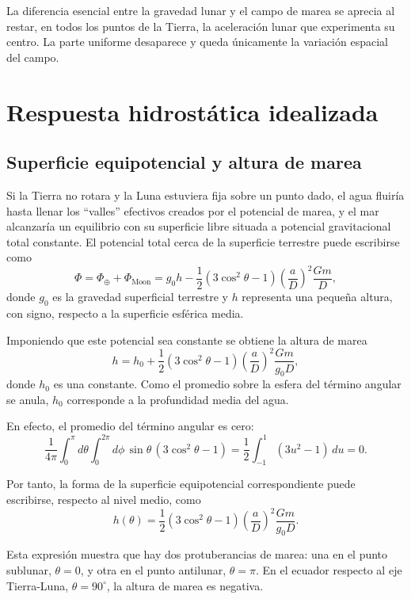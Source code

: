 La diferencia esencial entre la gravedad lunar y el campo de marea se aprecia al restar, en todos los puntos de la Tierra, la aceleración lunar que experimenta su centro. La parte uniforme desaparece y queda únicamente la variación espacial del campo.

\figuraCampoMarea

\section{Respuesta hidrostática idealizada}

\subsection{Superficie equipotencial y altura de marea}

Si la Tierra no rotara y la Luna estuviera fija sobre un punto dado, el agua fluiría hasta llenar los “valles” efectivos creados por el potencial de marea, y el mar alcanzaría un equilibrio con su superficie libre situada a potencial gravitacional total constante. El potencial total cerca de la superficie terrestre puede escribirse como
$$ \Phi = \Phi_{\oplus} + \Phi_{\mathrm{Moon}} = g_0 h - \frac{1}{2}(3\cos^2\theta - 1)\left(\frac{a}{D}\right)^2\frac{Gm}{D}, $$
donde $g_0$ es la gravedad superficial terrestre y $h$ representa una pequeña altura, con signo, respecto a la superficie esférica media.

Imponiendo que este potencial sea constante se obtiene la altura de marea
$$ h = h_0 + \frac{1}{2}(3\cos^2\theta - 1)\left(\frac{a}{D}\right)^2\frac{Gm}{g_0D}, $$
donde $h_0$ es una constante. Como el promedio sobre la esfera del término angular se anula, $h_0$ corresponde a la profundidad media del agua.

En efecto, el promedio del término angular es cero:
$$ \frac{1}{4\pi}\int_0^\pi d\theta \int_0^{2\pi} d\phi\,\sin\theta\,(3\cos^2\theta - 1) = \frac{1}{2}\int_{-1}^{1}(3u^2 - 1)\,du = 0. $$

Por tanto, la forma de la superficie equipotencial correspondiente puede escribirse, respecto al nivel medio, como
$$ h(\theta) = \frac{1}{2}(3\cos^2\theta - 1)\left(\frac{a}{D}\right)^2\frac{Gm}{g_0D}. $$

Esta expresión muestra que hay dos protuberancias de marea: una en el punto sublunar, $\theta = 0$, y otra en el punto antilunar, $\theta = \pi$. En el ecuador respecto al eje Tierra-Luna, $\theta = 90^\circ$, la altura de marea es negativa.

